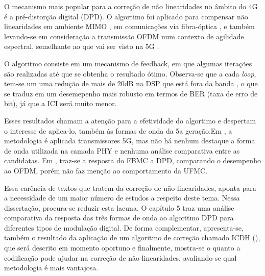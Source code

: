 O mecanismo mais popular para a correção de não linearidades no âmbito do 4G é a pré-distorção digital (DPD). O algortimo foi aplicado para compensar não linearidades em ambiente MIMO \cite{gregorio}, em comunicações via fibra-óptica \cite{Shang}, \cite{Silva} e também levando-se em consideração a transmissão OFDM num contexto de agilidade espectral, semelhante ao que vai ser visto na 5G \cite{ZhuFu}. 
\par O algoritmo consiste em um mecanismo de feedback, em que algumas iterações são realizadas até que se obtenha o resultado ótimo. Observa-se que a cada \textit{loop}, tem-se um uma redução de mais de 20dB na DSP que está fora da banda \cite{ZhuFu}, o que se traduz em um desemepenho mais robusto em termos de BER (taxa de erro de bit), já que a ICI será muito menor. 
\par Esses resultados chamam a atenção para a efetividade do algortimo e despertam o interesse de aplica-lo, também às formas de onda da 5a geração.Em \cite{Zhang}, a metodologia é aplicada transmissores 5G, mas não há nenhum destaque a forma de onda utilizada na camada PHY e nenhuma análise comparativa entre as candidatas. Em \cite{Abdelaziz}, traz-se a resposta do FBMC a DPD, comparando o desempenho ao OFDM, porém não faz menção ao comportamento da UFMC. 
\par Essa carência de textos que tratem da correção de não-linearidades, aponta para a necessidade de um maior número de estudos a respeito deste tema. Nessa dissertação, procura-se reduzir esta lacuna. O capítulo 5 traz uma análise comparativa da resposta das três formas de onda ao algoritmo DPD para diferentes tipos de modulação digital. De forma complementar, apresenta-se, também o resultado da aplicação de um algoritmo de correção chamado ICDH (), que será descrito em momento oportuno e finalmente, mostra-se o quanto a codificação pode ajudar na correção de não linearidades, avaliando-se qual metodologia é mais vantajosa. 





